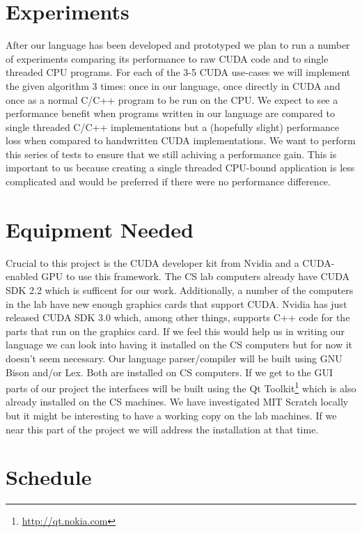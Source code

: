 \documentclass{article}
\begin{document}
\section{Experiments}
\label{sec:experiments}
After our language has been developed and prototyped we plan to run a number of experiments comparing its performance to raw CUDA code and to single threaded CPU programs. For each of the 3-5 CUDA use-cases we will implement the given algorithm 3 times: once in our language, once directly in CUDA and once as a normal C/C++ program to be run on the CPU. We expect to see a performance benefit when programs written in our language are compared to single threaded C/C++ implementations but a (hopefully slight) performance loss when compared to handwritten CUDA implementations. We want to perform this series of tests to ensure that we still achiving a performance gain. This is important to us because creating a single threaded CPU-bound application is less complicated and would be preferred if there were no performance difference.

\section{Equipment Needed}
Crucial to this project is the CUDA developer kit from Nvidia and a CUDA-enabled GPU to use this framework. The CS lab computers already have CUDA SDK 2.2 which is sufficent for our work. Additionally, a number of the computers in the lab have new enough graphics cards that support CUDA. Nvidia has just released CUDA SDK 3.0 which, among other things, supports C++ code for the parts that run on the graphics card. If we feel this would help us in writing our language we can look into having it installed on the CS computers but for now it doesn't seem necessary. Our language parser/compiler will be built using GNU Bison and/or Lex. Both are installed on CS computers. If we get to the GUI parts of our project the interfaces will be built using the Qt Toolkit\footnote{\url{http://qt.nokia.com}} which is also already installed on the CS machines. We have investigated MIT Scratch locally but it might be interesting to have a working copy on the lab machines. If we near this part of the project we will address the installation at that time.

\section{Schedule}
\label{sec:schedule}
\end{document}
